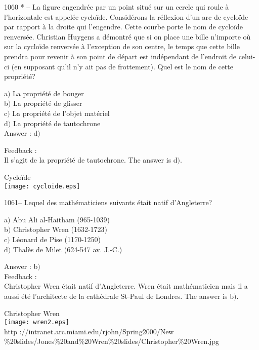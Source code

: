 \documentclass[letterpaper, 12pt]{article}
\begin{document}
1060 * -- La figure engendr\'ee par un point situ\'e sur un cercle
qui roule \`a l'horizontale est appel\'ee cyclo\"ide. Consid\'erons
la r\'eflexion d'un arc de cyclo\"ide par rapport \`a la droite qui
l'engendre. Cette courbe porte le nom de cyclo\"ide renvers\'ee.
Christian Huygens a d\'emontr\'e que si on place une bille n'importe
o\`u sur la cyclo\"ide renvers\'ee \`a l'exception de son centre, le
temps que cette bille prendra pour revenir \`a son point de d\'epart
est ind\'ependant de l'endroit de celui-ci (en supposant qu'il n'y
ait pas de frottement). Quel est le nom de cette propri\'et\'e?

a$)$ La propri\'et\'e de bouger  \\
b$)$ La propri\'et\'e de glisser  \\
c$)$ La propri\'et\'e de l'objet mat\'eriel \\
d$)$ La propri\'et\'e de tautochrone \\

Answer : d$)$

Feedback : \\
Il s'agit de la propri\'et\'e de tautochrone.
The answer is d$)$.\\

        \begin{center}

Cyclo\"ide        \\
    \texttt{[image: cycloide.eps]}\\
    \end{center}

1061-- Lequel des math\'ematiciens suivants \'etait natif
d'Angleterre?

a$)$ Abu Ali al-Haitham (965-1039) \\
b$)$ Christopher Wren (1632-1723) \\
c$)$ L\'eonard de Pise (1170-1250) \\
d$)$ Thal\`es de Milet (624-547 av. J.-C.)

Answer : b$)$\\

Feedback : \\
Christopher Wren \'etait natif d'Angleterre. Wren \'etait
math\'ematicien mais il a aussi \'et\'e l'architecte de la
cath\'edrale St-Paul de Londres.
The answer is b$)$.\\

        \begin{center}
        Christopher Wren\\
    \texttt{[image: wren2.eps]}\\
        {\footnotesize http ://intranet.arc.miami.edu/rjohn/Spring2000/New\\
        \%20slides/Jones\%20and\%20Wren\%20slides/Christopher\%20Wren.jpg}
    \end{center}
\end{document}
